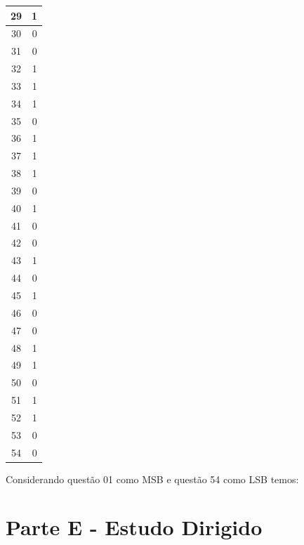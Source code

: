 \documentclass[12pt,a4paper,titlepage]{article}
\begin{document}
\begin{table}[h]
\begin{tabular}{|c|c|}
        \hline
        29 & 1 \\
        \hline
        30 & 0 \\
        \hline
        31 & 0 \\
        \hline
        32 & 1 \\
        \hline
        33 & 1 \\
        \hline
        34 & 1 \\
        \hline
        35 & 0 \\
        \hline
        36 & 1 \\
        \hline
        37 & 1 \\
        \hline
        38 & 1 \\
        \hline
        39 & 0 \\
        \hline
        40 & 1 \\
        \hline
        41 & 0 \\
        \hline
        42 & 0 \\
        \hline
        43 & 1 \\
        \hline
        44 & 0 \\
        \hline
        45 & 1 \\
        \hline
        46 & 0 \\
        \hline
        47 & 0 \\
        \hline
        48 & 1 \\
        \hline
        49 & 1 \\
        \hline
        50 & 0 \\
        \hline
        51 & 1 \\
        \hline
        52 & 1 \\
        \hline
        53 & 0 \\
        \hline
        54 & 0 \\
        \hline
    \end{tabular}
    \label{gabarito_v_f}
\end{table}

Considerando questão 01 como MSB e questão 54 como LSB temos:
\begin{center}

    \vspace{0.5em}

\end{center}

\section{Parte E - Estudo Dirigido}
\end{document}
